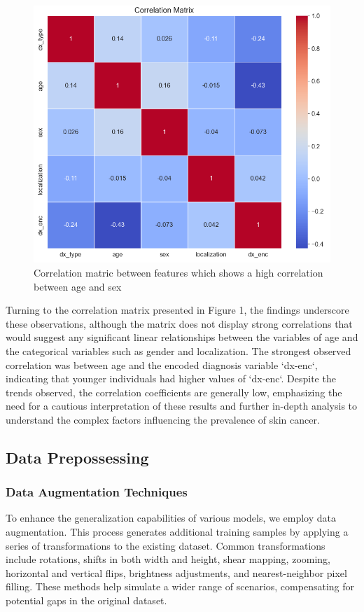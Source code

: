 \documentclass[conference]{IEEEtran}
\begin{document}
\begin{figure}[h]
    \centering
    \includegraphics[width=1\linewidth]{fig5.png}
    \caption{Correlation matric between features which shows a high correlation between age and sex}
    \label{fig:fig1}
\end{figure}

Turning to the correlation matrix presented in Figure 1, the findings underscore these observations, although the matrix does not display strong correlations that would suggest any significant linear relationships between the variables of age and the categorical variables such as gender and localization. The strongest observed correlation was between age and the encoded diagnosis variable `dx-enc`, indicating that younger individuals had higher values of `dx-enc`. Despite the trends observed, the correlation coefficients are generally low, emphasizing the need for a cautious interpretation of these results and further in-depth analysis to understand the complex factors influencing the prevalence of skin cancer.


\subsection{Data Prepossessing}

\subsubsection{Data Augmentation Techniques}
To enhance the generalization capabilities of various models, we employ data augmentation. This process generates additional training samples by applying a series of transformations to the existing dataset. Common transformations include rotations, shifts in both width and height, shear mapping, zooming, horizontal and vertical flips, brightness adjustments, and nearest-neighbor pixel filling. These methods help simulate a wider range of scenarios, compensating for potential gaps in the original dataset.
\end{document}

